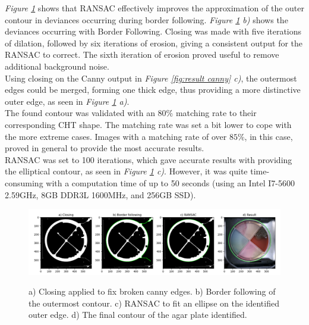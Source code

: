 \noindent\textit{Figure \ref{fig:result ransac}} shows that RANSAC effectively improves the approximation of the outer contour in deviances occurring during border following. \textit{Figure \ref{fig:result ransac} b)} shows the deviances occurring with Border Following. Closing was made with five iterations of dilation, followed by six iterations of erosion, giving a consistent output for the RANSAC to correct. The sixth iteration of erosion proved useful to remove additional background noise. \\

\noindent Using closing on the Canny output in \textit{Figure \ref{fig:result canny} c)}, the outermost edges could be merged, forming one thick edge, thus providing a more distinctive outer edge, as seen in \textit{Figure \ref{fig:result ransac} a)}.\\

\noindent The found contour was validated with an $ 80\%$ matching rate to their corresponding CHT shape. The matching rate was set a bit lower to cope with the more extreme cases. Images with a matching rate of over $ 85\%$, in this case, proved in general to provide the most accurate results.\\

\noindent RANSAC was set to 100 iterations, which gave accurate results with providing the elliptical contour, as seen in \textit{Figure \ref{fig:result ransac} c)}. However, it was quite time-consuming with a computation time of up to 50 seconds (using an Intel I7-5600 2.59GHz, 8GB DDR3L 1600MHz, and 256GB SSD).


\begin{figure}[H]
    \centering
     \includegraphics[width=1\linewidth]{figures/PDF/Ransac.pdf}\\
    \caption{a) Closing applied to fix broken canny edges. b) Border following of the outermost contour. c) RANSAC to fit an ellipse on the identified outer edge. d) The final contour of the agar plate identified.}
    \label{fig:result ransac}
\end{figure}



